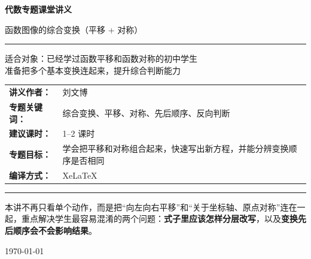\documentclass[11pt,a4paper,fontset=fandol]{ctexart}
\theoremstyle{formaltheorem}
\theoremstyle{formalexample}
\begin{document}
\thispagestyle{empty}
\begin{titlepage}
\centering
\vspace*{0.9cm}

\begin{tcolorbox}[
  enhanced,
  width=0.92\textwidth,
  colback=white,
  colframe=mainblue,
  boxrule=1pt,
  arc=0mm,
  left=6mm,
  right=6mm,
  top=8mm,
  bottom=8mm
]
\centering

{\fontsize{24}{30}\selectfont\bfseries 代数专题课堂讲义\par}
\vspace{0.7cm}
{\fontsize{17}{22}\selectfont 函数图像的综合变换（平移 + 对称）\par}

\vspace{1.1cm}
\color{rulegray}\rule{0.72\textwidth}{0.7pt}\par
\vspace{1cm}

\begin{tcolorbox}[colback=lightblue,colframe=mainblue,width=0.82\textwidth,boxrule=1pt]
\centering
{\Large 适合对象：已经学过函数平移和函数对称的初中学生}\\[0.4em]
{\large 准备把多个基本变换连起来，提升综合判断能力}
\end{tcolorbox}

\vspace{1.2cm}

\renewcommand{\arraystretch}{1.42}
\begin{tabular}{>{\bfseries}p{3.5cm}p{8cm}}
讲义作者： & 刘文博 \\
专题关键词： & 综合变换、平移、对称、先后顺序、反向判断 \\
建议课时： & 1--2 课时 \\
专题目标： & 学会把平移和对称组合起来，快速写出新方程，并能分辨变换顺序是否相同 \\
编译方式： & XeLaTeX \\
\end{tabular}

\vspace{1.2cm}
\color{rulegray}\rule{0.72\textwidth}{0.7pt}\par
\vspace{0.8cm}

{\normalsize 本讲不再只看单个动作，而是把“向左向右平移”和“关于坐标轴、原点对称”连在一起，重点解决学生最容易混淆的两个问题：\textbf{式子里应该怎样分层改写}，以及\textbf{变换先后顺序会不会影响结果}。\par}

\vspace{0.5cm}
{\large \today\par}
\end{tcolorbox}
\end{titlepage}
\end{document}
